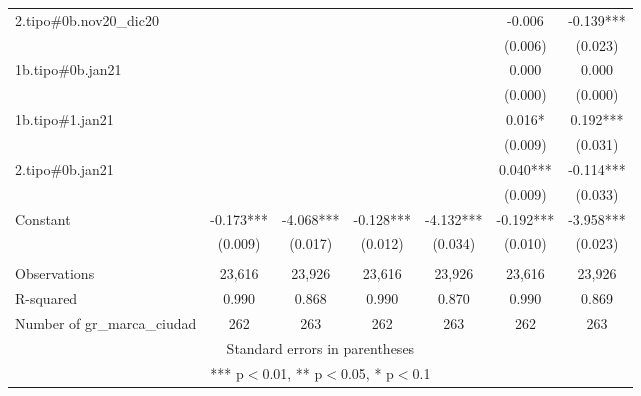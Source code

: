\begin{tabular}{lcccccc}
2.tipo\#0b.nov20\_dic20 &  &  &  &  & -0.006 & -0.139*** \\
 &  &  &  &  & (0.006) & (0.023) \\
1b.tipo\#0b.jan21 &  &  &  &  & 0.000 & 0.000 \\
 &  &  &  &  & (0.000) & (0.000) \\
1b.tipo\#1.jan21 &  &  &  &  & 0.016* & 0.192*** \\
 &  &  &  &  & (0.009) & (0.031) \\
2.tipo\#0b.jan21 &  &  &  &  & 0.040*** & -0.114*** \\
 &  &  &  &  & (0.009) & (0.033) \\
Constant & -0.173*** & -4.068*** & -0.128*** & -4.132*** & -0.192*** & -3.958*** \\
 & (0.009) & (0.017) & (0.012) & (0.034) & (0.010) & (0.023) \\
 &  &  &  &  &  &  \\
Observations & 23,616 & 23,926 & 23,616 & 23,926 & 23,616 & 23,926 \\
R-squared & 0.990 & 0.868 & 0.990 & 0.870 & 0.990 & 0.869 \\
 Number of gr\_marca\_ciudad & 262 & 263 & 262 & 263 & 262 & 263 \\ \hline
\multicolumn{7}{c}{ Standard errors in parentheses} \\
\multicolumn{7}{c}{ *** p$<$0.01, ** p$<$0.05, * p$<$0.1} \\
\end{tabular}
